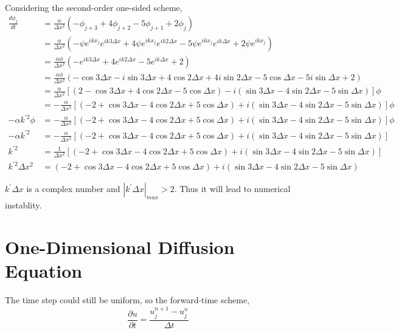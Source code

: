 \documentclass[letterpaper,10pt]{article}
\begin{document}
Considering the second-order one-sided scheme, 
\begin{align*}
  \frac{d\phi_j}{dt}&=\frac{\alpha}{\Delta x^2}\left(-\phi_{j+3}+4\phi_{j+2}-5\phi_{j+1}+2\phi_j\right)\\
  &=\frac{\alpha}{\Delta x^2}\left(-\psi e^{ikx_j}e^{ik3\Delta x}+4\psi e^{ikx_j}e^{ik2\Delta x}-5\psi e^{ikx_j}e^{ik\Delta x}+2\psi e^{ikx_j}\right)\\
  &=\frac{\alpha \phi}{\Delta x^2}\left(-e^{ik3\Delta x}+4e^{ik2\Delta x}-5e^{ik\Delta x}+2\right)\\
  &=\frac{\alpha \phi}{\Delta x^2}\left(-\cos 3\Delta x-i\sin 3\Delta x+4\cos 2\Delta x +4i\sin 2\Delta x - 5\cos \Delta x -5i\sin \Delta x +2\right)\\
  &=\frac{\alpha}{\Delta x^2}\left[\left(2-\cos3\Delta x+4\cos 2\Delta x-5\cos \Delta x\right)-i\left(\sin 3\Delta x -4\sin 2\Delta x - 5\sin \Delta x\right)\right]\phi\\
  &=-\frac{\alpha}{\Delta x^2}\left[\left(-2+\cos3\Delta x-4\cos 2\Delta x+5\cos \Delta x\right)+i\left(\sin 3\Delta x -4\sin 2\Delta x - 5\sin \Delta x\right)\right]\phi\\
  -\alpha k^{'2} \phi &=-\frac{\alpha}{\Delta x^2}\left[\left(-2+\cos3\Delta x-4\cos 2\Delta x+5\cos \Delta x\right)+i\left(\sin 3\Delta x -4\sin 2\Delta x - 5\sin \Delta x\right)\right]\phi\\
  -\alpha k^{'2} &=-\frac{\alpha}{\Delta x^2}\left[\left(-2+\cos3\Delta x-4\cos 2\Delta x+5\cos \Delta x\right)+i\left(\sin 3\Delta x -4\sin 2\Delta x - 5\sin \Delta x\right)\right]\\
  k^{'2}&=\frac{1}{\Delta x^2}\left[\left(-2+\cos3\Delta x-4\cos 2\Delta x+5\cos \Delta x\right)+i\left(\sin 3\Delta x -4\sin 2\Delta x - 5\sin \Delta x\right)\right]\\
  k^{'2}\Delta x^2 &=\left(-2+\cos3\Delta x-4\cos 2\Delta x+5\cos \Delta x\right)+i\left(\sin 3\Delta x -4\sin 2\Delta x - 5\sin \Delta x\right)
\end{align*}

$k^{'}\Delta x$ is a complex number and $|k^{'}\Delta x|_{max}>2$. Thus it will lead to numerical instablity. 
\section{One-Dimensional Diffusion Equation}
The time step could still be uniform, so the forward-time scheme, 
\begin{equation*}
  \frac{\partial u}{\partial t}=\frac{u_j^{n+1}-u_j^n}{\Delta t}
\end{equation*}
\end{document}

